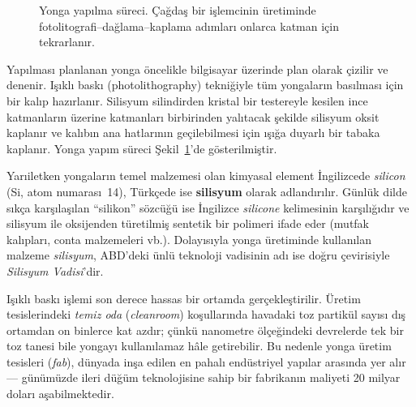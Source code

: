 \begin{figure}[H]
\caption[Yonga yapılma süreci]{Yonga yapılma süreci. Çağdaş bir işlemcinin üretiminde fotolitografi--dağlama--kaplama adımları onlarca katman için tekrarlanır.}
\label{fig:yonga-yapim}
\end{figure}

Yapılması planlanan yonga öncelikle bilgisayar üzerinde plan olarak çizilir ve denenir. Işıklı baskı (photolithography) tekniğiyle tüm yongaların basılması için bir kalıp hazırlanır. Silisyum silindirden kristal bir testereyle kesilen ince katmanların üzerine katmanları birbirinden yalıtacak şekilde silisyum oksit kaplanır ve kalıbın ana hatlarının geçilebilmesi için ışığa duyarlı bir tabaka kaplanır. Yonga yapım süreci Şekil~\ref{fig:yonga-yapim}'de gösterilmiştir.

\begin{bilginot}
Yarıiletken yongaların temel malzemesi olan kimyasal element İngilizcede \emph{silicon} (Si, atom numarası~14), Türkçede ise \textbf{silisyum} olarak adlandırılır. Günlük dilde sıkça karşılaşılan ``silikon'' sözcüğü ise İngilizce \emph{silicone} kelimesinin karşılığıdır ve silisyum ile oksijenden türetilmiş sentetik bir polimeri ifade eder (mutfak kalıpları, conta malzemeleri vb.). Dolayısıyla yonga üretiminde kullanılan malzeme \emph{silisyum}, ABD'deki ünlü teknoloji vadisinin adı ise doğru çevirisiyle \emph{Silisyum Vadisi}'dir.
\end{bilginot}

Işıklı baskı işlemi son derece hassas bir ortamda gerçekleştirilir. Üretim tesislerindeki \emph{temiz oda} (\emph{cleanroom}) koşullarında havadaki toz partikül sayısı dış ortamdan on binlerce kat azdır; çünkü nanometre ölçeğindeki devrelerde tek bir toz tanesi bile yongayı kullanılamaz hâle getirebilir. Bu nedenle yonga üretim tesisleri (\emph{fab}), dünyada inşa edilen en pahalı endüstriyel yapılar arasında yer alır --- günümüzde ileri düğüm teknolojisine sahip bir fabrikanın maliyeti 20 milyar doları aşabilmektedir.

